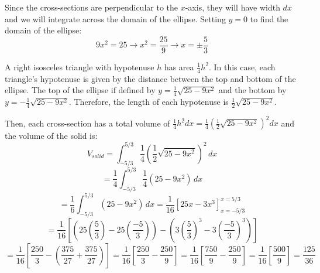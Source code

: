 \begin{Answer}[ref = volume6]
Since the cross-sections are perpendicular to the $x$-axis, they will have 
width $dx$ and we will integrate across the domain of the ellipse. Setting $y =
0$ to find the domain of the ellipse:
$$9x^2 = 25 \to x^2 = \frac{25}{9} \to x = \pm \frac{5}{3}$$

A right isosceles triangle with hypotenuse $h$ has area $\frac{1}{4}h^2$. In 
this case, each triangle's hypotenuse is given by the distance between the top 
and bottom of the ellipse. The top of the ellipse if defined by $y = \frac{1}{4
} \sqrt{25 - 9x^2}$ and the bottom by $y = -\frac{1}{4} \sqrt{25 - 9x^2}$. 
Therefore, the length of each hypotenuse is $\frac{1}{2}\sqrt{25-9x^2}$. 

Then, each cross-section has a total volume of $\frac{1}{4}h^2 dx = \frac{1}{4}
\left( \frac{1}{2} \sqrt{25 - 9x^2} \right)^2 dx$ and the volume of the solid 
is:
$$V_{solid} = \int_{-5/3}^{5/3} \frac{1}{4} \left( \frac{1}{2} \sqrt{25 - 9x^2}
\right)^2 \, dx$$
$$= \frac{1}{4} \int_{-5/3}^{5/3} \frac{1}{4} \left( 25 - 9x^2 \right) \, dx$$
$$= \frac{1}{6} \int_{-5/3}^{5/3} \left( 25 - 9x^2 \right) \, dx = \frac{1}{16}
\left[ 25x - 3x^3 \right]_{x = -5/3}^{x = 5/3}$$
$$= \frac{1}{16} \left[ \left( 25 \left( \frac{5}{3} \right) - 25 \left( \frac{
-5}{3} \right) \right) - \left( 3 \left( \frac{5}{3} \right)^3 - 3 \left( 
\frac{-5}{3} \right)^3 \right) \right]$$
$$= \frac{1}{16} \left[ \frac{250}{3} - \left( \frac{375}{27} + \frac{375}{27} 
\right) \right] = \frac{1}{16} \left[ \frac{250}{3} - \frac{250}{9}\right] = 
\frac{1}{16} \left[  \frac{750}{9} - \frac{250}{9} \right] = \frac{1}{16} 
\left[ \frac{500}{9} \right] = \frac{125}{36}$$
\end{Answer}


